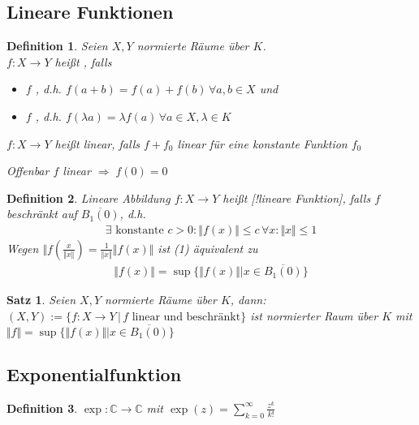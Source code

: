 \documentclass[ngerman,a4paper]{report}
\theoremstyle{break}
\newtheorem{satz}[theorem]{Satz}
\newtheorem*{definition}{Definition}
\newcommand{\highlight}[1]{\emph{#1}}
\begin{document}
\subsection*{Lineare Funktionen}
\begin{definition}
	Seien $X,Y$ normierte Räume über $K$.\\
	$f: X\rightarrow Y$ heißt , falls
	\begin{itemize}
		\item $f$ , d.h. $f(a+b) = f(a) + f(b) \,\forall a,b\in X$ und
		\item $f$ , d.h. $f(\lambda a) = \lambda f(a)\,\forall a\in X,\lambda\in K$
	\end{itemize}

	$f:X\to Y$ heißt \highlight{linear}, falls $f+f_0$ linear für eine konstante Funktion $f_0$
	
	Offenbar $f$ linear $\Rightarrow\;f(0) = 0$
\end{definition}
\begin{definition}
	Lineare Abbildung $f:X\to Y$ heißt [!lineare Funktion], falls $f$ beschränkt auf $\overline{B_1(0)}$, d.h. \begin{align}
		\tag{1}\exists\text{ konstante }c > 0: \Vert f(x)\Vert \le c\,\forall x: \Vert x\Vert \le 1
	\end{align}
	Wegen $\Vert f\left( \frac{x}{\Vert x \Vert}\right) = \frac{1}{\Vert x \Vert} \Vert f(x) \Vert$ ist (1) äquivalent zu
	\begin{align}
		\tag{1'} \Vert f(x) \Vert = \sup \{ \Vert f(x) \Vert | x \in \overline{B_1(0)}\}
	\end{align}
\end{definition}
\begin{satz}
	Seien $X,Y$ normierte Räume über $K$, dann:\\
	$(X,Y):= \{ f:X\to Y \,|\, f \text{ linear und beschränkt} \}$ ist normierter Raum über $K$ mit $\Vert f \Vert = \sup \{ \Vert f(x) \Vert | x\in \overline{B_1(0)} \}$
\end{satz}

\subsection*{Exponentialfunktion}
\begin{definition}
	$\exp:\mathbb{C}\to \mathbb{C}$ mit $\exp(z) = \sum_{k=0}^\infty \frac{z^k}{k!}$
\end{definition}
\end{document}
